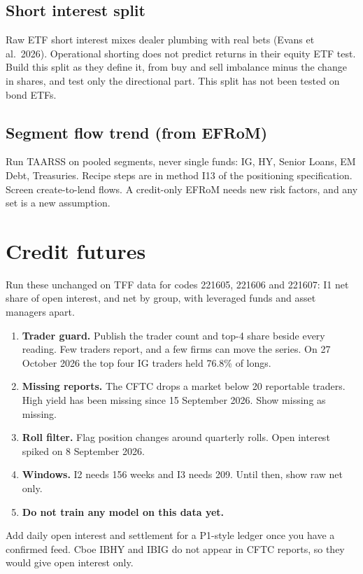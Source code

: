 \documentclass[11pt]{article}
\begin{document}
\subsection{Short interest split}
Raw ETF short interest mixes dealer plumbing with real bets (Evans et al.\ 2026). Operational shorting does not predict returns in their equity ETF test. Build this split as they define it, from buy and sell imbalance minus the change in shares, and test only the directional part. This split has not been tested on bond ETFs.

\subsection{Segment flow trend (from EFRoM)}
Run TAARSS on pooled segments, never single funds: IG, HY, Senior Loans, EM Debt, Treasuries. Recipe steps are in method I13 of the positioning specification. Screen create-to-lend flows. A credit-only EFRoM needs new risk factors, and any set is a new assumption.

\section{Credit futures}\label{sec:fut}
Run these unchanged on TFF data for codes 221605, 221606 and 221607: I1 net share of open interest, and net by group, with leveraged funds and asset managers apart.

\begin{enumerate}
\item \textbf{Trader guard.} Publish the trader count and top-4 share beside every reading. Few traders report, and a few firms can move the series. On 27 October 2026 the top four IG traders held 76.8\% of longs.
\item \textbf{Missing reports.} The CFTC drops a market below 20 reportable traders. High yield has been missing since 15 September 2026. Show missing as missing.
\item \textbf{Roll filter.} Flag position changes around quarterly rolls. Open interest spiked on 8 September 2026.
\item \textbf{Windows.} I2 needs 156 weeks and I3 needs 209. Until then, show raw net only.
\item \textbf{Do not train any model on this data yet.}
\end{enumerate}
Add daily open interest and settlement for a P1-style ledger once you have a confirmed feed. Cboe IBHY and IBIG do not appear in CFTC reports, so they would give open interest only.
\end{document}
